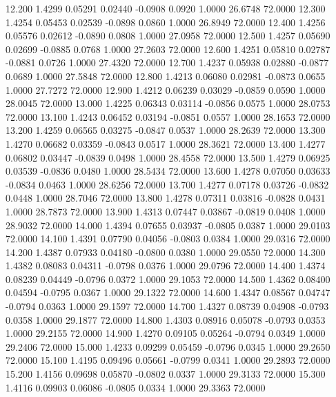   12.200   1.4299   0.05291   0.02440  -0.0908   0.0920   1.0000  26.6748  72.0000
  12.300   1.4254   0.05453   0.02539  -0.0898   0.0860   1.0000  26.8949  72.0000
  12.400   1.4256   0.05576   0.02612  -0.0890   0.0808   1.0000  27.0958  72.0000
  12.500   1.4257   0.05690   0.02699  -0.0885   0.0768   1.0000  27.2603  72.0000
  12.600   1.4251   0.05810   0.02787  -0.0881   0.0726   1.0000  27.4320  72.0000
  12.700   1.4237   0.05938   0.02880  -0.0877   0.0689   1.0000  27.5848  72.0000
  12.800   1.4213   0.06080   0.02981  -0.0873   0.0655   1.0000  27.7272  72.0000
  12.900   1.4212   0.06239   0.03029  -0.0859   0.0590   1.0000  28.0045  72.0000
  13.000   1.4225   0.06343   0.03114  -0.0856   0.0575   1.0000  28.0753  72.0000
  13.100   1.4243   0.06452   0.03194  -0.0851   0.0557   1.0000  28.1653  72.0000
  13.200   1.4259   0.06565   0.03275  -0.0847   0.0537   1.0000  28.2639  72.0000
  13.300   1.4270   0.06682   0.03359  -0.0843   0.0517   1.0000  28.3621  72.0000
  13.400   1.4277   0.06802   0.03447  -0.0839   0.0498   1.0000  28.4558  72.0000
  13.500   1.4279   0.06925   0.03539  -0.0836   0.0480   1.0000  28.5434  72.0000
  13.600   1.4278   0.07050   0.03633  -0.0834   0.0463   1.0000  28.6256  72.0000
  13.700   1.4277   0.07178   0.03726  -0.0832   0.0448   1.0000  28.7046  72.0000
  13.800   1.4278   0.07311   0.03816  -0.0828   0.0431   1.0000  28.7873  72.0000
  13.900   1.4313   0.07447   0.03867  -0.0819   0.0408   1.0000  28.9032  72.0000
  14.000   1.4394   0.07655   0.03937  -0.0805   0.0387   1.0000  29.0103  72.0000
  14.100   1.4391   0.07790   0.04056  -0.0803   0.0384   1.0000  29.0316  72.0000
  14.200   1.4387   0.07933   0.04180  -0.0800   0.0380   1.0000  29.0550  72.0000
  14.300   1.4382   0.08083   0.04311  -0.0798   0.0376   1.0000  29.0796  72.0000
  14.400   1.4374   0.08239   0.04449  -0.0796   0.0372   1.0000  29.1053  72.0000
  14.500   1.4362   0.08400   0.04594  -0.0795   0.0367   1.0000  29.1322  72.0000
  14.600   1.4347   0.08567   0.04747  -0.0794   0.0363   1.0000  29.1597  72.0000
  14.700   1.4327   0.08739   0.04908  -0.0793   0.0358   1.0000  29.1877  72.0000
  14.800   1.4303   0.08916   0.05078  -0.0793   0.0353   1.0000  29.2155  72.0000
  14.900   1.4270   0.09105   0.05264  -0.0794   0.0349   1.0000  29.2406  72.0000
  15.000   1.4233   0.09299   0.05459  -0.0796   0.0345   1.0000  29.2650  72.0000
  15.100   1.4195   0.09496   0.05661  -0.0799   0.0341   1.0000  29.2893  72.0000
  15.200   1.4156   0.09698   0.05870  -0.0802   0.0337   1.0000  29.3133  72.0000
  15.300   1.4116   0.09903   0.06086  -0.0805   0.0334   1.0000  29.3363  72.0000
